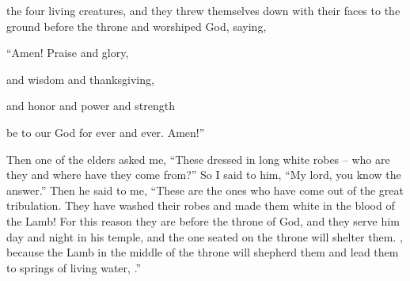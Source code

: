 {the four
living creatures,
and
they threw
themselves down
with
their
faces
to the ground
before
the throne
and
worshiped
God,
saying,
\par }{\Q “Amen! Praise
and
glory,
\par }{\Q and
wisdom
and
thanksgiving,
\par }{\Q and
honor
and
power
and
strength
\par }{\Q be to our
God
for
ever
and ever.
Amen!”
\par }{\PP {}Then
one
of the elders
asked
me,
“These
dressed in
long
white
robes
– who
are they
and
where
have they come from?”
So
I said
to him,
“My
lord,
you
know
the answer.” Then
he said
to me,
“These
are
the ones who have come
out of
the great
tribulation.
They have washed
their
robes
and
made
them
white
in
the blood
of the Lamb!
For
this reason
they are
before
the throne
of God,
and
they serve
him
day
and
night
in
his
temple,
and
the one seated
on
the throne
will shelter
them.
,
because
the Lamb
in the middle
of the throne
will shepherd
them
and
lead
them
to springs
of
living
water,
{}.”

}
